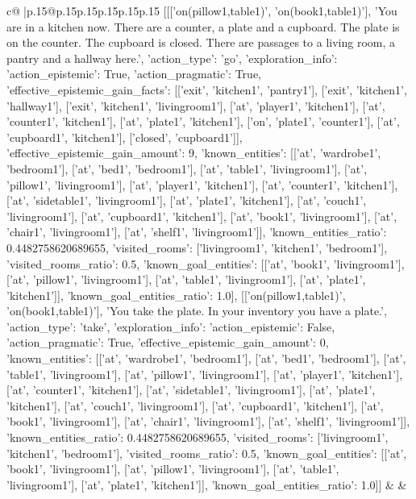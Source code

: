 \documentclass{article}
\begin{document}
{\begin{supertabular}{c@{$\;$}|p{.15\linewidth}@{}p{.15\linewidth}p{.15\linewidth}p{.15\linewidth}p{.15\linewidth}p{.15\linewidth}}
{{{	 [[['on(pillow1,table1)', 'on(book1,table1)'], 'You are in a kitchen now. There are a counter, a plate and a cupboard. The plate is on the counter. The cupboard is closed. There are passages to a living room, a pantry and a hallway here.', {'action_type': 'go', 'exploration_info': {'action_epistemic': True, 'action_pragmatic': True, 'effective_epistemic_gain_facts': [['exit', 'kitchen1', 'pantry1'], ['exit', 'kitchen1', 'hallway1'], ['exit', 'kitchen1', 'livingroom1'], ['at', 'player1', 'kitchen1'], ['at', 'counter1', 'kitchen1'], ['at', 'plate1', 'kitchen1'], ['on', 'plate1', 'counter1'], ['at', 'cupboard1', 'kitchen1'], ['closed', 'cupboard1']], 'effective_epistemic_gain_amount': 9, 'known_entities': [['at', 'wardrobe1', 'bedroom1'], ['at', 'bed1', 'bedroom1'], ['at', 'table1', 'livingroom1'], ['at', 'pillow1', 'livingroom1'], ['at', 'player1', 'kitchen1'], ['at', 'counter1', 'kitchen1'], ['at', 'sidetable1', 'livingroom1'], ['at', 'plate1', 'kitchen1'], ['at', 'couch1', 'livingroom1'], ['at', 'cupboard1', 'kitchen1'], ['at', 'book1', 'livingroom1'], ['at', 'chair1', 'livingroom1'], ['at', 'shelf1', 'livingroom1']], 'known_entities_ratio': 0.4482758620689655, 'visited_rooms': ['livingroom1', 'kitchen1', 'bedroom1'], 'visited_rooms_ratio': 0.5, 'known_goal_entities': [['at', 'book1', 'livingroom1'], ['at', 'pillow1', 'livingroom1'], ['at', 'table1', 'livingroom1'], ['at', 'plate1', 'kitchen1']], 'known_goal_entities_ratio': 1.0}}], [['on(pillow1,table1)', 'on(book1,table1)'], 'You take the plate. In your inventory you have a plate.', {'action_type': 'take', 'exploration_info': {'action_epistemic': False, 'action_pragmatic': True, 'effective_epistemic_gain_amount': 0, 'known_entities': [['at', 'wardrobe1', 'bedroom1'], ['at', 'bed1', 'bedroom1'], ['at', 'table1', 'livingroom1'], ['at', 'pillow1', 'livingroom1'], ['at', 'player1', 'kitchen1'], ['at', 'counter1', 'kitchen1'], ['at', 'sidetable1', 'livingroom1'], ['at', 'plate1', 'kitchen1'], ['at', 'couch1', 'livingroom1'], ['at', 'cupboard1', 'kitchen1'], ['at', 'book1', 'livingroom1'], ['at', 'chair1', 'livingroom1'], ['at', 'shelf1', 'livingroom1']], 'known_entities_ratio': 0.4482758620689655, 'visited_rooms': ['livingroom1', 'kitchen1', 'bedroom1'], 'visited_rooms_ratio': 0.5, 'known_goal_entities': [['at', 'book1', 'livingroom1'], ['at', 'pillow1', 'livingroom1'], ['at', 'table1', 'livingroom1'], ['at', 'plate1', 'kitchen1']], 'known_goal_entities_ratio': 1.0}}]] 
	  } 
	   } 
	   } 
	 & & \\ 
 

    \theutterance {}  


\end{supertabular}}
\end{document}
